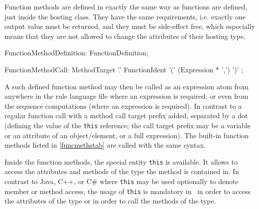 Function methods are defined in exactly the same way as functions are defined, just inside the hosting class.
They have the same requirements, 
i.e. exactly one output value must be returned, 
and they must be side-effect free, which especially means that they are not allowed to change the attributes of their hosting type.

\begin{rail} 
  FunctionMethodDefinition: FunctionDefinition;
\end{rail}

\begin{rail}
  FunctionMethodCall: MethodTarget '.' FunctionIdent '(' (Expression * ',') ')' ;
\end{rail}

A such defined function method may then be called as an expression atom from anywhere in the rule language file where an expression is required; or even from the sequence computations (where an expression is required).
In contrast to a regular function call with a method call target prefix added, separated by a dot (defining the value of the \texttt{this} reference; the call target prefix may be a variable or an attribute of an object/element, or a full expression).
The built-in function methods listed in \ref{funcmethstab} are called with the same syntax.

Inside the function methods, the special entity \texttt{this} is available.
It allows to access the attributes and methods of the type the method is contained in.
In contrast to Java, C++, or C\# where \texttt{this} may be used optionally to denote member or method access,
the usage of \texttt{this} is mandatory in \GrG~in order to access the attributes of the type or in order to call the methods of the type.


